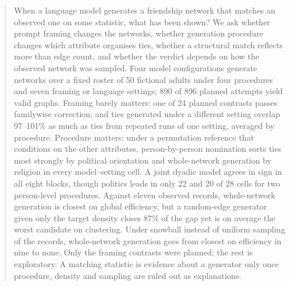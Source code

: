 \documentclass{article}
\begin{document}
\printAffiliationsAndNotice{}

\begin{abstract}
When a language model generates a friendship network that matches an observed one on some statistic, what has been shown? We ask whether prompt framing changes the networks, whether generation procedure changes which attribute organises ties, whether a structural match reflects more than edge count, and whether the verdict depends on how the observed network was sampled. Four model configurations generate networks over a fixed roster of 50 fictional adults under four procedures and seven framing or language settings; 890 of 896 planned attempts yield valid graphs. Framing barely matters: one of 24 planned contrasts passes familywise correction, and ties generated under a different setting overlap 97--101\% as much as ties from repeated runs of one setting, averaged by procedure. Procedure matters: under a permutation reference that conditions on the other attributes, person-by-person nomination sorts ties most strongly by political orientation and whole-network generation by religion in every model--setting cell. A joint dyadic model agrees in sign in all eight blocks, though politics leads in only 22 and 20 of 28 cells for two person-level procedures. Against eleven observed records, whole-network generation is closest on global efficiency, but a random-edge generator given only the target density closes 87\% of the gap yet is on average the worst candidate on clustering. Under snowball instead of uniform sampling of the records, whole-network generation goes from closest on efficiency in nine to none. Only the framing contrasts were planned; the rest is exploratory. A matching statistic is evidence about a generator only once procedure, density and sampling are ruled out as explanations.
\end{abstract}
\end{document}
